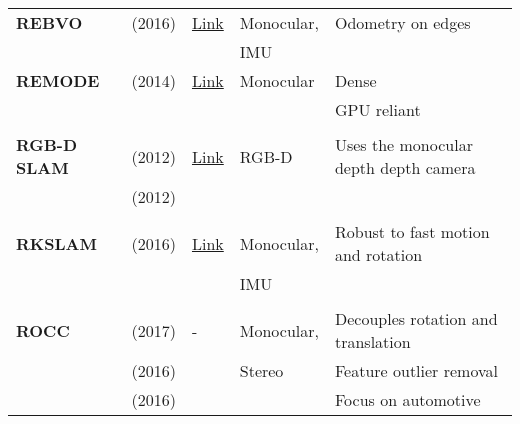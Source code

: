 {\begin{longtable}{l|l|l|l|l}
			\textbf{REBVO}         & \cite{Tarrio2016} (2016)          & {\href{https://github.com/JuanTarrio/rebvo}{Link}}                 & Monocular,            & Odometry on edges\\
			&                                   &                                                                    & IMU                   &\\
			\textbf{REMODE}        & \cite{Pizzoli2014} (2014)         & {\href{https://github.com/uzh-rpg/rpg_open_remode}{Link}}          & Monocular             & Dense\\
			&                                   &                                                                    &                       & GPU reliant\\
			&                                   &                                                                    &                       &\\
			\textbf{RGB-D SLAM}    & \cite{Endres2012} (2012)          & {\href{https://github.com/felixendres/rgbdslam_v2}{Link}}          & RGB-D                 & Uses the monocular depth depth camera \\
			& \cite{Endres2012a} (2012)         &                                                                    &                       &\\
			&                                   &                                                                    &                       &\\
			\textbf{RKSLAM}        & \cite{Liu2016} (2016)             & {\href{https://zjucvg.net/rkslam/rkslam.html}{Link}}               & Monocular,            & Robust to fast motion and rotation\\
			&                                   &                                                                    & IMU                   &\\
			&                                   &                                                                    &                       &\\
			\textbf{ROCC}          & \cite{Buczko2017} (2017)          & -                                                                  & Monocular,            & Decouples rotation and translation\\
			& \cite{Buczko2016} (2016)          &                                                                    & Stereo                & Feature outlier removal\\
			& \cite{Buczko2016a} (2016)         &                                                                    &                       & Focus on automotive\\

\end{longtable}}
